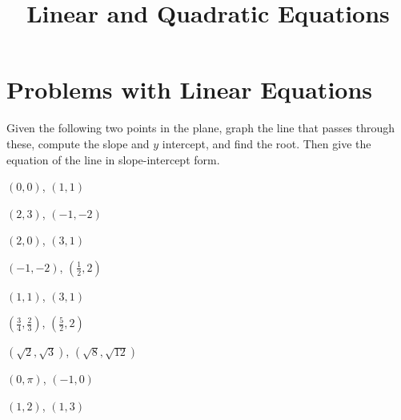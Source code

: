 \documentclass[crop=false,class=book,oneside]{standalone}                      %
\begin{document}
    \title{Linear and Quadratic Equations}
    \author{\vspace{-5ex}}
    \date{\vspace{-5ex}}
    \maketitle
    \setcounter{chapter}{1}
    \section{Problems with Linear Equations}
        \begin{problem}
            Given the following two points in the plane,
            graph the line that passes through these, compute
            the slope and $y$ intercept, and find the root.
            Then give the equation of the line in slope-intercept
            form.
            \begin{enumerate}
                \begin{multicols}{3}
                    \item $(0,0)$, $(1,1)$
                    \item $(2,3)$, $(\minus{1},\minus{2})$
                    \item $(2,0)$, $(3,1)$
                    \item $(\minus{1},\minus{2})$, $(\frac{1}{2},2)$
                    \item $(1,1)$, $(3,1)$
                    \item $(\frac{3}{4},\frac{2}{3})$, $(\frac{5}{2},2)$
                    \item $(\sqrt{2},\sqrt{3})$, $(\sqrt{8},\sqrt{12})$
                    \item $(0,\pi)$, $(\minus{1},0)$
                    \item $(1,2)$, $(1,3)$
                \end{multicols}
            \end{enumerate}
        \end{problem}
\end{document}
